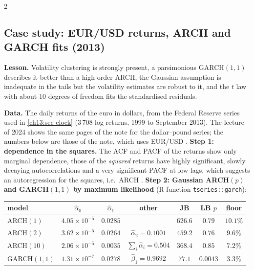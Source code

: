 \begin{paracol}{2}
\subsection{Case study: EUR/USD returns, ARCH and GARCH fits (2013)}\label{ch13:sec-fxcs}
\begin{casestudy}\label{ch13:cs-fx}
\textbf{Lesson.} Volatility clustering is strongly present, a parsimonious GARCH$(1,1)$ describes it better than a high-order ARCH, the Gaussian assumption is inadequate in the tails
but the volatility estimates are robust to it, and the $t$ law with about $10$ degrees of freedom fits the standardised residuals.
\end{casestudy}
\begin{secondary}
\textbf{Data.} The daily returns of the euro in dollars, from the Federal Reserve series used in \cref{ch13:sec-clock} (3\,708 log returns, 1999 to September 2013). The lecture of 2024 shows the same pages of the note for the
dollar--pound series; the numbers below are those of the note, which uses EUR/USD .
\textbf{Step 1: dependence in the squares.} The ACF and PACF of the returns show only marginal dependence, those of the \emph{squared} returns have highly significant, slowly decaying autocorrelations and a very significant PACF at low lags, which
suggests an autoregression for the squares, i.e.\ ARCH .
\textbf{Step 2: Gaussian ARCH$(p)$ and GARCH$(1,1)$ by maximum likelihood} (R function \texttt{tseries::garch}):
\begin{center}\small
\footnotesize\setlength{\tabcolsep}{3.5pt}
\begin{tabular}{@{}lcccccc@{}}
\toprule
model & $\hat\alpha_0$ & $\hat\alpha_1$ & other & JB & LB $p$ & floor\\
\midrule
ARCH$(1)$ & $4.05\times10^{-5}$ & $0.0285$ & & $626.6$ & $0.79$ & $10.1\%$\\
ARCH$(2)$ & $3.62\times10^{-5}$ & $0.0264$ & $\hat\alpha_2=0.1001$ & $459.2$ & $0.76$ & $9.6\%$\\
ARCH$(10)$ & $2.06\times10^{-5}$ & $0.0035$ & $\sum_{i}\hat\alpha_i=0.504$ & $368.4$ & $0.85$ & $7.2\%$\\
GARCH$(1,1)$ & $1.31\times10^{-7}$ & $0.0278$ & $\hat\beta_1=0.9692$ & $77.1$ & $0.0043$ & $3.3\%$\\
\bottomrule
\end{tabular}
\end{center}

\end{secondary}
\end{paracol}

